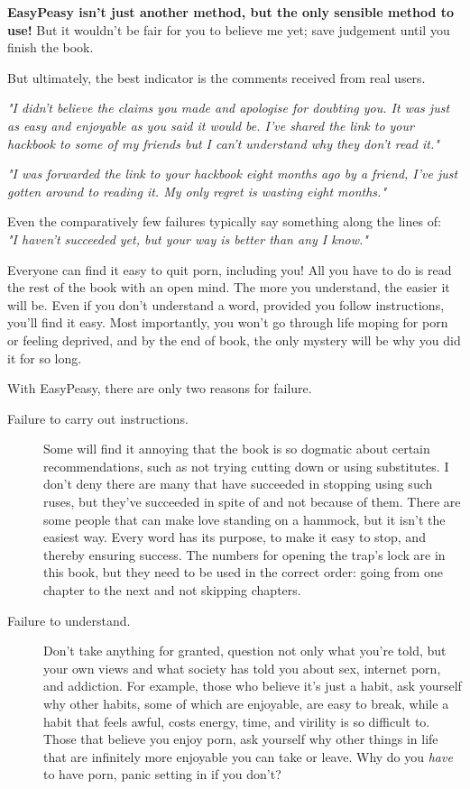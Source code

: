 \documentclass[easypeasy.tex]{subfiles}
\begin{document}
\textbf{EasyPeasy isn't just another method, but the only sensible method to use!} But it wouldn't be fair for you to believe me yet; save judgement until you finish the book.

But ultimately, the best indicator is the comments received from real users.

\textit{"I didn't believe the claims you made and apologise for doubting you. It was just as easy and enjoyable as you said it would be. I've shared the link to your hackbook to some of my friends but I can't understand why they don't read it."}

\textit{"I was forwarded the link to your hackbook eight months ago by a friend, I've just gotten around to reading it. My only regret is wasting eight months."}

Even the comparatively few failures typically say something along the lines of: \\ \textit{"I haven't succeeded yet, but your way is better than any I know."}

Everyone can find it easy to quit porn, including you! All you have to do is read the rest of the book with an open mind. The more you understand, the easier it will be. Even if you don't understand a word, provided you follow instructions, you'll find it easy. Most importantly, you won't go through life moping for porn or feeling deprived, and by the end of book, the only mystery will be why you did it for so long.

With EasyPeasy, there are only two reasons for failure.

\begin{description}
  \item [Failure to carry out instructions.] Some will find it annoying that the book is so dogmatic about certain recommendations, such as not trying cutting down or using substitutes. I don't deny there are many that have succeeded in stopping using such ruses, but they've succeeded in spite of and not because of them. There are some people that can make love standing on a hammock, but it isn't the easiest way. Every word has its purpose, to make it easy to stop, and thereby ensuring success. The numbers for opening the trap's lock are in this book, but they need to be used in the correct order: going from one chapter to the next and not skipping chapters.

  \item [Failure to understand.] Don't take anything for granted, question not only what you're told, but your own views and what society has told you about sex, internet porn, and addiction. For example, those who believe it's just a habit, ask yourself why other habits, some of which are enjoyable, are easy to break, while a habit that feels awful, costs energy, time, and virility is so difficult to. Those that believe you enjoy porn, ask yourself why other things in life that are infinitely more enjoyable you can take or leave. Why do you \textit{have} to have porn, panic setting in if you don't?
\end{description}
\end{document}
